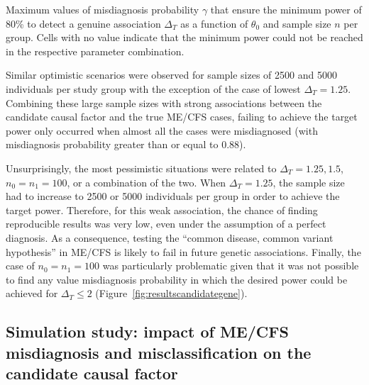 \begin{table}
    \centering
    \caption[Maximum values of misdiagnosis probability that ensure the minimum power of 80\% to detect a genuine association as a function of $\theta_0$ and sample size per group]{Maximum values of misdiagnosis probability $\gamma$ that ensure the minimum power of 80\% to detect a genuine association $\Delta_T$ as a function of $\theta_0$ and sample size $n$ per group. Cells with no value indicate that the minimum power could not be reached in the respective parameter combination.}
    
    \label{tab:candidategenep80}
\end{table}

Similar optimistic scenarios were observed for sample sizes of 2500 and 5000 individuals per study group with the exception of the case of lowest $\Delta_T = 1.25$. Combining these large sample sizes with strong associations between the candidate causal factor and the true ME/CFS cases, failing to achieve the target power only occurred when almost all the cases were misdiagnosed (with misdiagnosis probability greater than or equal to 0.88).

Unsurprisingly, the most pessimistic situations were related to $\Delta_T = 1.25, 1.5$, $n_0 = n_1 = 100$, or a combination of the two. When $\Delta_T = 1.25$, the sample size had to increase to 2500 or 5000 individuals per group in order to achieve the target power. Therefore, for this weak association, the chance of finding reproducible results was very low, even under the assumption of a perfect diagnosis. As a consequence, testing the ``common disease, common variant hypothesis'' in ME/CFS is likely to fail in future genetic associations. Finally, the case of $n_0 = n_1 = 100$ was particularly problematic given that it was not possible to find any value misdiagnosis probability in which the desired power could be achieved for $\Delta_T \leq 2$ (Figure~\ref{fig:resultscandidategene}).

\subsection{Simulation study: impact of ME/CFS misdiagnosis and misclassification on the candidate causal factor}

